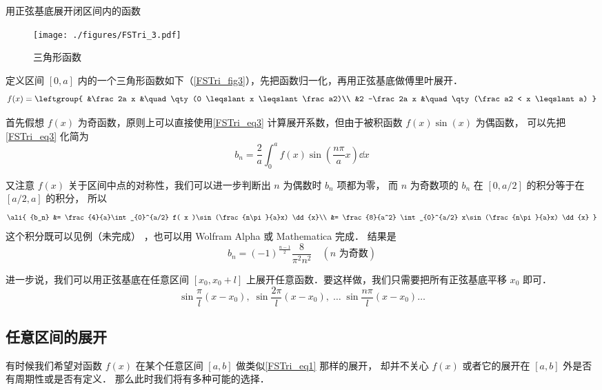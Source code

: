 \begin{example}{用正弦基底展开闭区间内的函数}

\begin{figure}[ht]
\centering
\texttt{[image: ./figures/FSTri\_3.pdf]}
\caption{三角形函数} \label{FSTri_fig3}
\end{figure}

定义区间 $[0,a]$ 内的一个三角形函数如下（\autoref{FSTri_fig3}），先把函数归一化，再用正弦基底做傅里叶展开．
\begin{equation}
f(x) = \leftgroup{
&\frac2a x &\quad \qty(0 \leqslant x \leqslant \frac a2)\\
&2 -\frac2a x &\quad \qty(\frac a2 < x \leqslant a)
}\end{equation}

首先假想 $f(x)$ 为奇函数，原则上可以直接使用\autoref{FSTri_eq3} 计算展开系数，但由于被积函数 $f(x)\sin(x)$ 为偶函数， 可以先把\autoref{FSTri_eq3} 化简为%
\begin{equation}
{b_n} = \frac{2}{a}\int_{0}^a f( x )\sin (\frac{n\pi}{a}x) \dd{x}
\end{equation}

又注意 $f(x)$ 关于区间中点的对称性，我们可以进一步判断出 $n$ 为偶数时 $b_n$ 项都为零， 而 $n$ 为奇数项的 $b_n$ 在 $[0, a/2]$ 的积分等于在 $[a/2, a]$ 的积分， 所以
\begin{equation}
\ali{
{b_n} &= \frac{4}{a}\int_{0}^{a/2} f( x )\sin (\frac{n\pi}{a}x) \dd{x}\\
&= \frac{8}{a^2} \int_{0}^{a/2} x\sin (\frac{n\pi}{a}x) \dd{x}
}\end{equation}
这个积分既可以见例（未完成）
，也可以用 Wolfram Alpha 或 Mathematica 完成．%
结果是
\begin{equation}
b_n = (-1)^{\frac{n-1}{2}} \frac{8}{\pi^2 n^2} \quad (\text{$n$ 为奇数})
\end{equation}
\end{example}
进一步说，我们可以用正弦基底在任意区间 $[x_0,x_0+l]$ 上展开任意函数．要这样做，我们只需要把所有正弦基底平移 $x_0$ 即可．
\begin{equation}
\sin\frac{\pi}{l} (x-x_0),\;   \sin\frac{2\pi}{l} (x-x_0),\;    \dots\;\sin\frac{n\pi}{l} (x-x_0) \dots
\end{equation}

\subsection{任意区间的展开}
有时候我们希望对函数 $f(x)$ 在某个任意区间 $[a, b]$ 做类似\autoref{FSTri_eq1} 那样的展开， 却并不关心 $f(x)$ 或者它的展开在 $[a, b]$ 外是否有周期性或是否有定义． 那么此时我们将有多种可能的选择．

